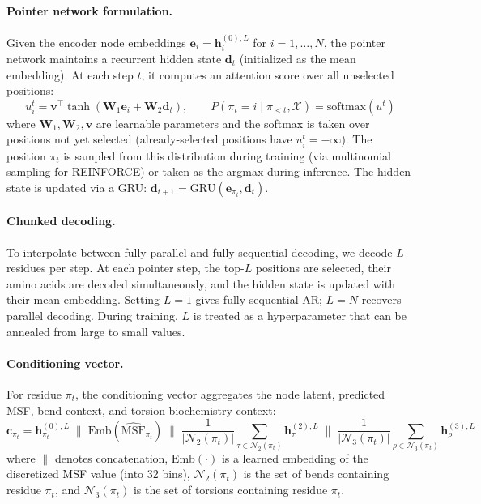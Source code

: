 \documentclass{article}
\begin{document}
\paragraph{Pointer network formulation.} Given the encoder node embeddings $\mathbf{e}_i = \mathbf{h}_i^{(0),L}$ for $i = 1, \ldots, N$, the pointer network maintains a recurrent hidden state $\mathbf{d}_t$ (initialized as the mean embedding). At each step $t$, it computes an attention score over all unselected positions:
\begin{equation}
    u_i^t = \mathbf{v}^\top \tanh(\mathbf{W}_1 \mathbf{e}_i + \mathbf{W}_2 \mathbf{d}_t), \qquad P(\pi_t = i \mid \pi_{<t}, \mathcal{X}) = \text{softmax}(u^t)
\end{equation}
where $\mathbf{W}_1, \mathbf{W}_2, \mathbf{v}$ are learnable parameters and the softmax is taken over positions not yet selected (already-selected positions have $u_i^t = -\infty$). The position $\pi_t$ is sampled from this distribution during training (via multinomial sampling for REINFORCE) or taken as the argmax during inference. The hidden state is updated via a GRU: $\mathbf{d}_{t+1} = \text{GRU}(\mathbf{e}_{\pi_t}, \mathbf{d}_t)$.

\paragraph{Chunked decoding.} To interpolate between fully parallel and fully sequential decoding, we decode $L$ residues per step. At each pointer step, the top-$L$ positions are selected, their amino acids are decoded simultaneously, and the hidden state is updated with their mean embedding. Setting $L = 1$ gives fully sequential AR; $L = N$ recovers parallel decoding. During training, $L$ is treated as a hyperparameter that can be annealed from large to small values.

\paragraph{Conditioning vector.} For residue $\pi_t$, the conditioning vector aggregates the node latent, predicted MSF, bend context, and torsion biochemistry context:
\begin{equation}
    \mathbf{c}_{\pi_t} = \mathbf{h}_{\pi_t}^{(0),L} \; \| \; \text{Emb}(\widehat{\text{MSF}}_{\pi_t}) \; \| \; \frac{1}{|\mathcal{N}_2(\pi_t)|}\sum_{\tau \in \mathcal{N}_2(\pi_t)} \mathbf{h}_\tau^{(2),L} \; \| \; \frac{1}{|\mathcal{N}_3(\pi_t)|}\sum_{\rho \in \mathcal{N}_3(\pi_t)} \mathbf{h}_\rho^{(3),L}
\end{equation}
where $\|$ denotes concatenation, $\text{Emb}(\cdot)$ is a learned embedding of the discretized MSF value (into 32 bins), $\mathcal{N}_2(\pi_t)$ is the set of bends containing residue $\pi_t$, and $\mathcal{N}_3(\pi_t)$ is the set of torsions containing residue $\pi_t$.
\end{document}
